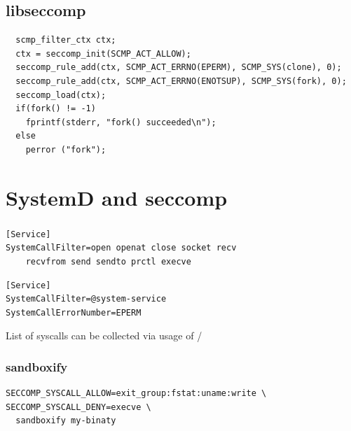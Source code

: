 \documentclass[usenames,dvipsnames]{beamer}
\newcommand{\codeinline}[1] {\texttt{\smaller[2]{#1}}}
\begin{document}
\subsection{libseccomp}
\begin{frame}[fragile]
\small
\begin{verbatim}
  scmp_filter_ctx ctx;
  ctx = seccomp_init(SCMP_ACT_ALLOW);
  seccomp_rule_add(ctx, SCMP_ACT_ERRNO(EPERM), SCMP_SYS(clone), 0);
  seccomp_rule_add(ctx, SCMP_ACT_ERRNO(ENOTSUP), SCMP_SYS(fork), 0);
  seccomp_load(ctx);
  if(fork() != -1)
    fprintf(stderr, "fork() succeeded\n");
  else
    perror ("fork");
\end{verbatim}
\end{frame}

\section{SystemD and seccomp}
\begin{frame}[fragile]
\frametitle{\secname}
\begin{verbatim}
[Service]
SystemCallFilter=open openat close socket recv
    recvfrom send sendto prctl execve
\end{verbatim}

\begin{verbatim}
[Service]
SystemCallFilter=@system-service
SystemCallErrorNumber=EPERM
\end{verbatim}
List of syscalls can be collected via usage of \codeinline{perf}/\codeinline{strace}
\end{frame}

\begin{frame}[fragile]
\frametitle{sandboxify}
\begin{verbatim}
SECCOMP_SYSCALL_ALLOW=exit_group:fstat:uname:write \
SECCOMP_SYSCALL_DENY=execve \
  sandboxify my-binaty
\end{verbatim}
\end{frame}
\end{document}

